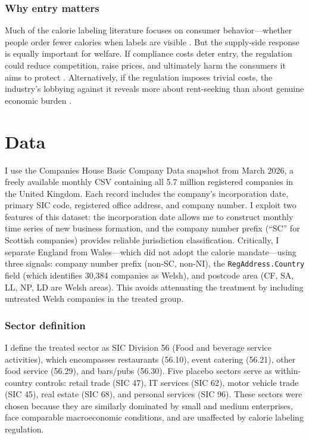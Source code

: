 \documentclass[12pt]{article}
\begin{document}
\subsubsection*{Why entry matters} Much of the calorie labeling literature focuses on consumer behavior---whether people order fewer calories when labels are visible \citep{bollinger2011, long2015, cantor2015}. But the supply-side response is equally important for welfare. If compliance costs deter entry, the regulation could reduce competition, raise prices, and ultimately harm the consumers it aims to protect \citep{dranove2003}. Alternatively, if the regulation imposes trivial costs, the industry's lobbying against it reveals more about rent-seeking than about genuine economic burden \citep{stigler1971}.

\section{Data}

I use the Companies House Basic Company Data snapshot from March 2026, a freely available monthly CSV containing all 5.7 million registered companies in the United Kingdom. Each record includes the company's incorporation date, primary SIC code, registered office address, and company number. I exploit two features of this dataset: the incorporation date allows me to construct monthly time series of new business formation, and the company number prefix (``SC'' for Scottish companies) provides reliable jurisdiction classification. Critically, I separate England from Wales---which did not adopt the calorie mandate---using three signals: company number prefix (non-SC, non-NI), the \texttt{RegAddress.Country} field (which identifies 30,384 companies as Welsh), and postcode area (CF, SA, LL, NP, LD are Welsh areas). This avoids attenuating the treatment by including untreated Welsh companies in the treated group.

\subsubsection*{Sector definition} I define the treated sector as SIC Division 56 (Food and beverage service activities), which encompasses restaurants (56.10), event catering (56.21), other food service (56.29), and bars/pubs (56.30). Five placebo sectors serve as within-country controls: retail trade (SIC 47), IT services (SIC 62), motor vehicle trade (SIC 45), real estate (SIC 68), and personal services (SIC 96). These sectors were chosen because they are similarly dominated by small and medium enterprises, face comparable macroeconomic conditions, and are unaffected by calorie labeling regulation.
\end{document}
